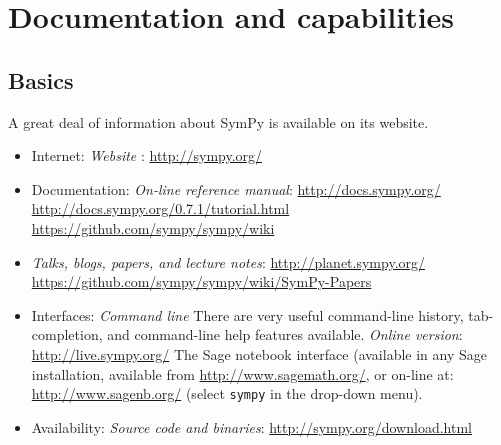 \documentclass[12pt]{article}
\begin{document}
\section{Documentation and capabilities}



\subsection{Basics}

A great deal of information about SymPy is available on its website.


\begin{itemize}
\item
Internet:
\newline
{\it Website} :
\newline
\url{http://sympy.org/}


\item
Documentation:
\newline
{\it On-line reference manual}:
\newline
\url{http://docs.sympy.org/}
\newline
\url{http://docs.sympy.org/0.7.1/tutorial.html}
\newline
\url{https://github.com/sympy/sympy/wiki}

\item
{\it Talks, blogs, papers, and lecture notes}:
\newline
\url{http://planet.sympy.org/}
\newline
\url{https://github.com/sympy/sympy/wiki/SymPy-Papers}

\item
Interfaces:
\newline
{\it Command line}
\newline
There are very useful command-line history, tab-completion, and
command-line help features available.
\newline
{\it Online version}:
\newline
\url{http://live.sympy.org/}
\newline
The Sage notebook interface (available in any Sage installation,
available from \url{http://www.sagemath.org/}, or on-line at:
\url{http://www.sagenb.org/} (select {\tt sympy} in the drop-down menu).
\item
Availability:
\newline
{\it Source code and binaries}:
\url{http://sympy.org/download.html}


\end{itemize}
\end{document}
